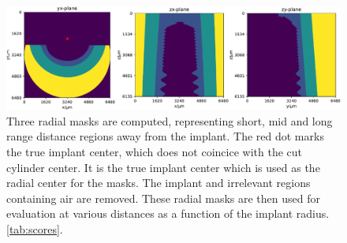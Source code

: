 \begin{figure}
  \centering
  \includegraphics[width=\textwidth]{figures/radial_masks.pdf}
  \caption{Three radial masks are computed, representing short, mid and
	long range distance regions away from the implant. The red dot marks
	the true implant center, which does not coincice with the cut cylinder
	center. It is the true implant center which is used as the radial
	center for the masks. The implant and irrelevant regions containing air
	are removed.  These radial masks are then used for evaluation at
	various distances as a function of the implant radius.
	\cref{tab:scores}.}
  \label{fig:radialmasks}
\end{figure}

